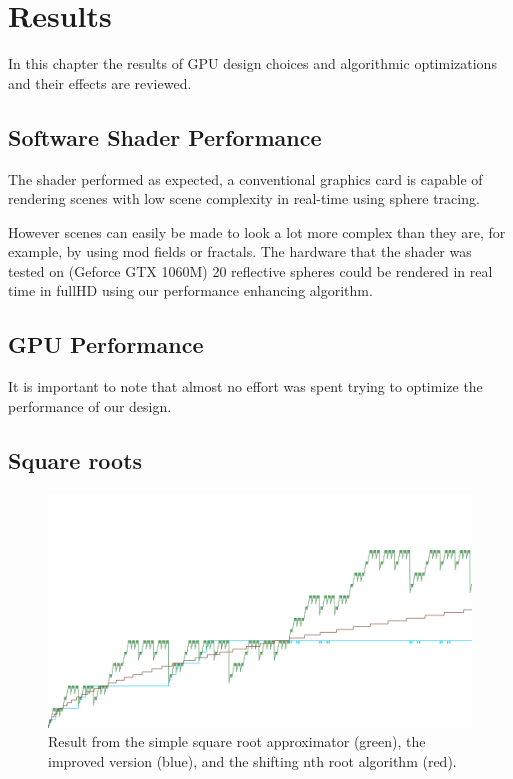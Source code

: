 \chapter{Results}

	In this chapter the results of GPU design choices and algorithmic optimizations
	and their effects are reviewed.

	\section{Software Shader Performance}

		The shader performed as expected, a conventional graphics card is 
		capable of rendering scenes with low scene complexity in real-time
		using sphere tracing.

		However scenes can easily be made to look a lot more complex than they 
		are, for example, by using mod fields or fractals. The hardware that 
		the shader was tested on (Geforce GTX 1060M) 20 reflective spheres could
		be rendered in real time in fullHD using our performance enhancing 
		algorithm.
		


	\section{GPU Performance}

		It is important to note that almost no effort was spent trying to
		optimize the performance of our design. 
	
	\section{Square roots}

		\begin{figure}[H]
			\centering
			\includegraphics[width=0.75\linewidth]{figure/value12x.png} 
			\caption{Result from the simple square root approximator (green),
				the improved version (blue), and the shifting nth root 
				algorithm (red).}
			\label{orsqrt2}
		\end{figure}

